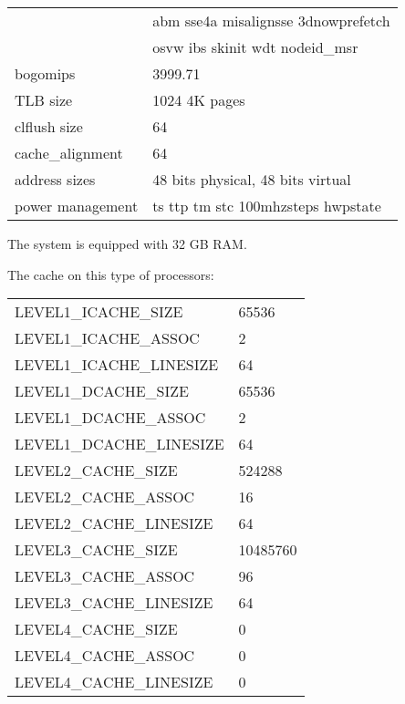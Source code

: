 \documentclass[utf8,12pt]{report}
\begin{document}
\begin{table}
\begin{tabular}{|l|l|}
		                & abm sse4a misalignsse 3dnowprefetch \\
		                & osvw ibs skinit wdt nodeid\_msr \\
		bogomips        & 3999.71 \\
		TLB size        & 1024 4K pages \\
		clflush size    & 64 \\
		cache\_alignment & 64 \\
		address sizes    & 48 bits physical, 48 bits virtual \\
		power management & ts ttp tm stc 100mhzsteps hwpstate \\
		\hline
	\end{tabular}
\end{table}


The system is equipped with 32 GB RAM.

The cache on this type of processors:

\begin{table}
	\begin{tabular}{|l|l|}
	\hline
		LEVEL1\_ICACHE\_SIZE                 & 65536 \\
		LEVEL1\_ICACHE\_ASSOC                & 2 \\
		LEVEL1\_ICACHE\_LINESIZE             & 64 \\
		LEVEL1\_DCACHE\_SIZE                 & 65536 \\
		LEVEL1\_DCACHE\_ASSOC                & 2 \\
		LEVEL1\_DCACHE\_LINESIZE             & 64 \\
		LEVEL2\_CACHE\_SIZE                  & 524288 \\
		LEVEL2\_CACHE\_ASSOC                 & 16 \\
		LEVEL2\_CACHE\_LINESIZE              & 64 \\
		LEVEL3\_CACHE\_SIZE                  & 10485760 \\
		LEVEL3\_CACHE\_ASSOC                 & 96 \\
		LEVEL3\_CACHE\_LINESIZE              & 64 \\
		LEVEL4\_CACHE\_SIZE                  & 0 \\
		LEVEL4\_CACHE\_ASSOC                 & 0 \\
		LEVEL4\_CACHE\_LINESIZE              & 0 \\
	\hline
	\end{tabular}
\end{table}
\end{document}
